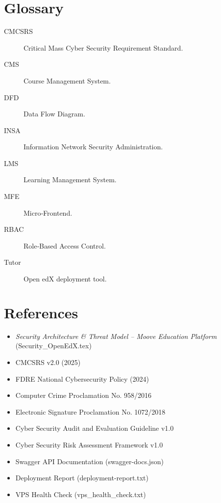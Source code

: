\section{Glossary}
\begin{description}
    \item[CMCSRS] Critical Mass Cyber Security Requirement Standard.
    \item[CMS] Course Management System.
    \item[DFD] Data Flow Diagram.
    \item[INSA] Information Network Security Administration.
    \item[LMS] Learning Management System.
    \item[MFE] Micro‑Frontend.
    \item[RBAC] Role‑Based Access Control.
    \item[Tutor] Open edX deployment tool.
\end{description}

\section{References}
\begin{itemize}
    \item \textit{Security Architecture \& Threat Model – Moove Education Platform} (Security\_OpenEdX.tex)
    \item CMCSRS v2.0 (2025)
    \item FDRE National Cybersecurity Policy (2024)
    \item Computer Crime Proclamation No. 958/2016
    \item Electronic Signature Proclamation No. 1072/2018
    \item Cyber Security Audit and Evaluation Guideline v1.0
    \item Cyber Security Risk Assessment Framework v1.0
    \item Swagger API Documentation (swagger-docs.json)
    \item Deployment Report (deployment-report.txt)
    \item VPS Health Check (vps\_health\_check.txt)
\end{itemize}


